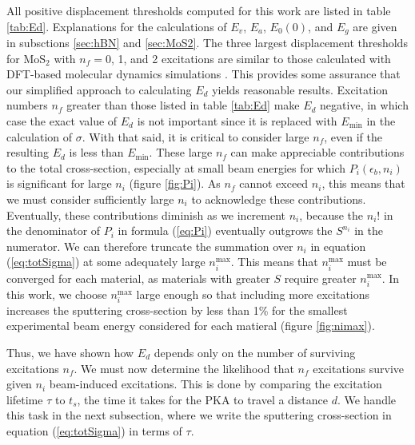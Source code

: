 \documentclass{article}
\begin{document}
All positive displacement thresholds computed for this work are listed in table
\ref{tab:Ed}.
Explanations for the calculations of $E_v$, $E_a$, $E_0(0)$, and $E_g$ are
given in subsctions \ref{sec:hBN} and \ref{sec:MoS2}.
The three largest displacement thresholds for MoS$_2$ with $n_f = 0$, 1, and 2
excitations are similar to those calculated with DFT-based molecular dynamics
simulations \cite{Kretschmer2020}.
This provides some assurance that our simplified approach to calculating $E_d$
yields reasonable results.
Excitation numbers $n_f$ greater than those listed in table \ref{tab:Ed} make
$E_d$ negative, in which case the exact value of $E_d$ is not important since
it is replaced with $E_\text{min}$ in the calculation of $\sigma$.
With that said, it is critical to consider large $n_f$, even if the resulting
$E_d$ is less than $E_\text{min}$.
These large $n_f$ can make appreciable contributions to the total
cross-section, especially at small beam energies for which $P_i(\epsilon_b,
n_i)$ is significant for large $n_i$ (figure \ref{fig:Pi}).
As $n_f$ cannot exceed $n_i$, this means that we must consider sufficiently
large $n_i$ to acknowledge these contributions.
Eventually, these contributions diminish as we increment $n_i$, because the
$n_i!$ in the denominator of $P_i$ in formula (\ref{eq:Pi}) eventually
outgrows the $S^{n_i}$ in the numerator.
We can therefore truncate the summation over $n_i$ in equation
(\ref{eq:totSigma}) at some adequately large $n_i^\text{max}$.
This means that $n_i^\text{max}$ must be converged for each material, as
materials with greater $S$ require greater $n_i^\text{max}$.
In this work, we choose $n_i^\text{max}$ large enough so that including more
excitations increases the sputtering cross-section by less than 1\% for the
smallest experimental beam energy considered for each matieral (figure
\ref{fig:nimax}).

Thus, we have shown how $E_d$ depends only on the number of surviving
excitations $n_f$.  We must now determine the likelihood that $n_f$ excitations
survive given $n_i$ beam-induced excitations.
This is done by comparing the excitation lifetime $\tau$ to $t_s$, the time it
takes for the PKA to travel a distance $d$.
We handle this task in the next subsection, where we write the sputtering
cross-section in equation (\ref{eq:totSigma}) in terms of
$\tau$.
\end{document}
